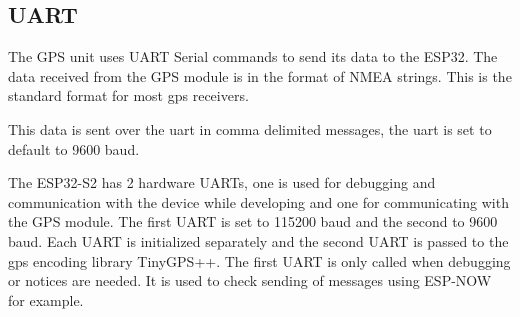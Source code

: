 \subsection{UART}
The GPS unit uses UART Serial commands to send its data to the ESP32. The data received from the GPS module is in the format of NMEA strings. This is the standard format for most gps receivers.\cite{NMEA}
\begin{table}[!htb]
	\label{tab:nmea}
	\caption{NMEA Sentences and their meanings \cite{GPSSentence}}
\end{table}
This data is sent over the uart in comma delimited messages, the uart is set to default to 9600 baud.

The ESP32-S2 has 2 hardware UARTs, one is used for debugging and communication with the device while developing and one for communicating with the GPS module. The first UART is set to 115200 baud and the second to 9600 baud. Each UART is initialized separately and the second UART is passed to the gps encoding library TinyGPS++. The first UART is only called when debugging or notices are needed. It is used to check sending of messages using ESP-NOW for example.


